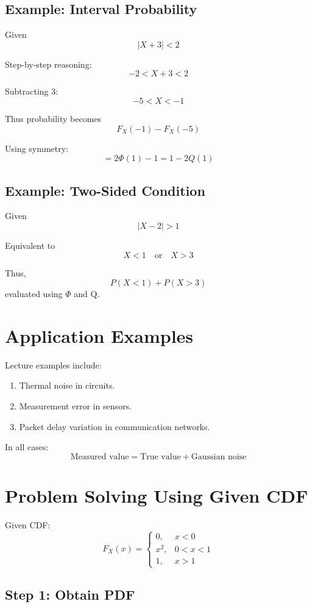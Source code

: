 \documentclass{article}
\begin{document}
\subsection{Example: Interval Probability}

Given
\[
|X + 3| < 2
\]

Step-by-step reasoning:
\[
-2 < X + 3 < 2
\]

Subtracting 3:
\[
-5 < X < -1
\]

Thus probability becomes
\[
F_X(-1) - F_X(-5)
\]

Using symmetry:
\[
= 2\Phi(1) - 1 = 1 - 2Q(1)
\]

\subsection{Example: Two-Sided Condition}

Given
\[
|X - 2| > 1
\]

Equivalent to
\[
X < 1 \quad \text{or} \quad X > 3
\]

Thus,
\[
P(X < 1) + P(X > 3)
\]
evaluated using $\Phi$ and Q.

\section{Application Examples}

Lecture examples include:

\begin{enumerate}
    \item Thermal noise in circuits.
    \item Measurement error in sensors.
    \item Packet delay variation in communication networks.
\end{enumerate}

In all cases:
\[
\text{Measured value} = \text{True value} + \text{Gaussian noise}
\]

\section{Problem Solving Using Given CDF}

Given CDF:
\[
F_X(x)=
\begin{cases}
0, & x<0 \\
x^2, & 0<x<1 \\
1, & x>1
\end{cases}
\]

\subsection*{Step 1: Obtain PDF}
\end{document}
